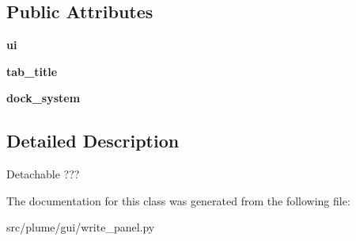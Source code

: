 \subsection*{Public Attributes}
\begin{DoxyCompactItemize}
\item 
{\bfseries ui}\hypertarget{classplume-creator_1_1src_1_1plume_1_1gui_1_1write__panel_1_1_write_sub_window_a0af8ee46ff209d5b6bb5295d553ebaf1}{}\label{classplume-creator_1_1src_1_1plume_1_1gui_1_1write__panel_1_1_write_sub_window_a0af8ee46ff209d5b6bb5295d553ebaf1}

\item 
{\bfseries tab\+\_\+title}\hypertarget{classplume-creator_1_1src_1_1plume_1_1gui_1_1write__panel_1_1_write_sub_window_a768eac67baf1570174fdd666ca06fea3}{}\label{classplume-creator_1_1src_1_1plume_1_1gui_1_1write__panel_1_1_write_sub_window_a768eac67baf1570174fdd666ca06fea3}

\item 
{\bfseries dock\+\_\+system}\hypertarget{classplume-creator_1_1src_1_1plume_1_1gui_1_1write__panel_1_1_write_sub_window_a6c60e60750cebf033d7065afd14c2e4e}{}\label{classplume-creator_1_1src_1_1plume_1_1gui_1_1write__panel_1_1_write_sub_window_a6c60e60750cebf033d7065afd14c2e4e}

\end{DoxyCompactItemize}


\subsection{Detailed Description}
Detachable ??? 

The documentation for this class was generated from the following file\+:\begin{DoxyCompactItemize}
\item 
src/plume/gui/write\+\_\+panel.\+py\end{DoxyCompactItemize}
